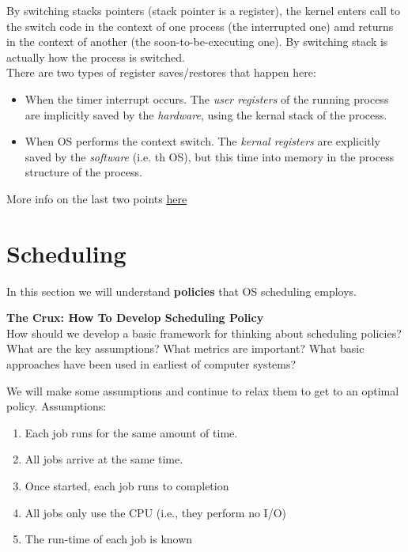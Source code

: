 By switching stacks pointers (stack pointer is a register),
the kernel enters call to the switch code in the 
context of one process (the interrupted one) amd returns in the context of
another (the soon-to-be-executing one). By switching stack is actually how the
process is switched.\\

There are two types of register saves/restores that happen here:

\begin{itemize}
    \item When the timer interrupt occurs. The \textit{user registers} of the
        running process are implicitly saved by the \textit{hardware}, using
        the kernal stack of the process.
    \item When OS performs the context switch. The \textit{kernal registers} 
        are explicitly saved by the \textit{software} (i.e. th OS), but this
        time into memory in the process structure of the process.
\end{itemize}

More info on the last two points \href{https://cs.stackexchange.com/questions/96550/whats-the-difference-between-user-registers-and-kernel-registers}{here}

\section{Scheduling}

In this section we will understand \textbf{policies} that OS scheduling
employs.\\

\begin{tcolorbox}
    \textbf{The Crux: How To Develop Scheduling Policy}\\

    How should we develop a basic framework for thinking about scheduling
    policies? What are the key assumptions? What metrics are important? What
    basic approaches have been used in earliest of computer systems?
\end{tcolorbox}

We will make some assumptions and continue to relax them to get to an optimal
policy. Assumptions:

\begin{enumerate}
    \item Each job runs for the same amount of time.
    \item All jobs arrive at the same time.
    \item Once started, each job runs to completion
    \item All jobs only use the CPU (i.e., they perform no I/O)
    \item The run-time of each job is known
\end{enumerate}

